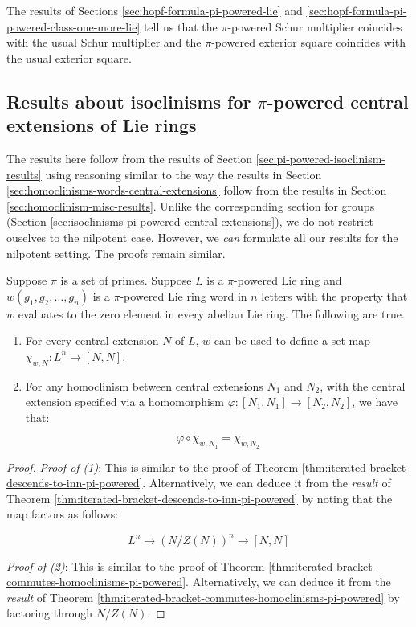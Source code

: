 The results of Sections \ref{sec:hopf-formula-pi-powered-lie} and
\ref{sec:hopf-formula-pi-powered-class-one-more-lie} tell us that the
$\pi$-powered Schur multiplier coincides with the usual Schur
multiplier and the $\pi$-powered exterior square coincides with the
usual exterior square.

\subsection{Results about isoclinisms for $\pi$-powered central extensions of Lie rings}\label{sec:isoclinisms-pi-powered-central-extensions-lie}

The results here follow from the results of Section
\ref{sec:pi-powered-isoclinism-results} using reasoning similar to the
way the results in Section
\ref{sec:homoclinisms-words-central-extensions} follow from the
results in Section \ref{sec:homoclinism-misc-results}. Unlike the
corresponding section for groups (Section
\ref{sec:isoclinisms-pi-powered-central-extensions}), we do not
restrict ouselves to the nilpotent case. However, we {\em can}
formulate all our results for the nilpotent setting. The proofs remain
similar.

\begin{lemma}\label{lemma:iterated-bracket-descends-extension-version-pi-powered}
  Suppose $\pi$ is a set of primes. Suppose $L$ is a $\pi$-powered Lie
  ring and $w(g_1,g_2,\dots,g_n)$ is a $\pi$-powered Lie
  ring word in $n$ letters with the property that $w$ evaluates to the
  zero element in every abelian Lie ring. The following are true.

  \begin{enumerate}
  \item For every central extension $N$ of $L$, $w$ can be used to
    define a set map $\chi_{w,N}: L^n \to [N,N]$.
  \item For any homoclinism between central extensions $N_1$ and
    $N_2$, with the central extension specified via a homomorphism
    $\varphi:[N_1,N_1] \to [N_2,N_2]$, we have that:

    $$\varphi \circ \chi_{w,N_1} = \chi_{w,N_2}$$
  \end{enumerate}
\end{lemma}


\begin{proof}
  {\em Proof of (1)}: This is similar to the proof of Theorem
  \ref{thm:iterated-bracket-descends-to-inn-pi-powered}. Alternatively, we can
  deduce it from the {\em result} of Theorem
  \ref{thm:iterated-bracket-descends-to-inn-pi-powered} by noting that the
  map factors as follows:

  $$L^n \to (N/Z(N))^n \to [N,N]$$

  {\em Proof of (2)}: This is similar to the proof of Theorem
  \ref{thm:iterated-bracket-commutes-homoclinisms-pi-powered}. Alternatively,
  we can deduce it from the {\em result} of Theorem
  \ref{thm:iterated-bracket-commutes-homoclinisms-pi-powered} by factoring
  through $N/Z(N)$.
\end{proof}

